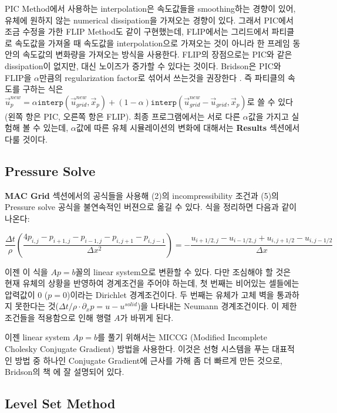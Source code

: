 \documentclass[11pt, A4]{article}
\begin{document}
PIC Method에서 사용하는 interpolation은 속도값들을 smoothing하는 경향이 있어, 유체에 원하지 않는 numerical dissipation을 가져오는 경향이 있다. 그래서 PIC에서 조금 수정을 가한 FLIP Method도 같이 구현했는데, FLIP에서는 그리드에서 파티클로 속도값을 가져올 때 속도값을 interpolation으로 가져오는 것이 아니라 한 프레임 동안의 속도값의 변화량을 가져오는 방식을 사용한다. FLIP의 장점으로는 PIC와 같은 dissipation이 없지만, 대신 노이즈가 증가할 수 있다는 것이다. Bridson은 PIC와 FLIP을 $\alpha$만큼의 regularization factor로 섞어서 쓰는것을 권장한다 \cite[p. 118]{fluid-sim-cg}. 즉 파티클의 속도를 구하는 식은 $\vec{u}_p^{new} = \alpha \texttt{interp}(\vec{u}_{grid}^{new}, \vec{x}_p) + (1 - \alpha) \texttt{interp}(\vec{u}_{grid}^{new} - \vec{u}_{grid}, \vec{x}_p)$로 쓸 수 있다 (왼쪽 항은 PIC, 오른쪽 항은 FLIP). 최종 프로그램에서는 서로 다른 $\alpha$값을 가지고 실험해 볼 수 있는데, $\alpha$값에 따른 유체 시뮬레이션의 변화에 대해서는 \textbf{Results} 섹션에서 다룰 것이다.

\subsection{Pressure Solve}

\textbf{MAC Grid} 섹션에서의 공식들을 사용해 (2)의 incompressibility 조건과 (5)의 Pressure solve 공식을 불연속적인 버젼으로 옮길 수 있다. 식을 정리하면 다음과 같이 나온다:

\begin{equation}
  \frac{\Delta t}{\rho} (\frac{4p_{i,j} - p_{i+1,j} - p_{i-1,j} - p_{i,j+1} - p_{i,j-1}}{\Delta x^2}) = -\frac{u_{i+1/2,j} - u_{i-1/2,j} + u_{i,j+1/2} - u_{i,j-1/2}}{\Delta x}
\end{equation}

이젠 이 식을 $Ap = b$꼴의 linear system으로 변환할 수 있다. 다만 조심해야 할 것은 현재 유체의 상황을 반영하여 경계조건을 주어야 하는데, 첫 번째는 비어있는 셀들에는 압력값이 0 ($p = 0$)이라는 Dirichlet 경계조건이다. 두 번째는 유체가 고체 벽을 통과하지 못한다는 것($\Delta t / \rho \cdot \partial_x p = u - u^{solid}$)을 나타내는 Neumann 경계조건이다. \cite[p. 69-70]{fluid-sim-cg} 이 제한조건들을 적용함으로 인해 행렬 $A$가 바뀌게 된다.

이젠 linear system $Ap = b$를 풀기 위해서는 MICCG (Modified Incomplete Cholesky Conjugate Gradient) 방법을 사용한다. 이것은 선형 시스템을 푸는 대표적인 방법 중 하나인 Conjugate Gradient에 근사를 가해 좀 더 빠르게 만든 것으로, Bridson의 책 \cite[p.79]{fluid-sim-cg}에 잘 설명되어 있다.

\subsection{Level Set Method}
\end{document}
